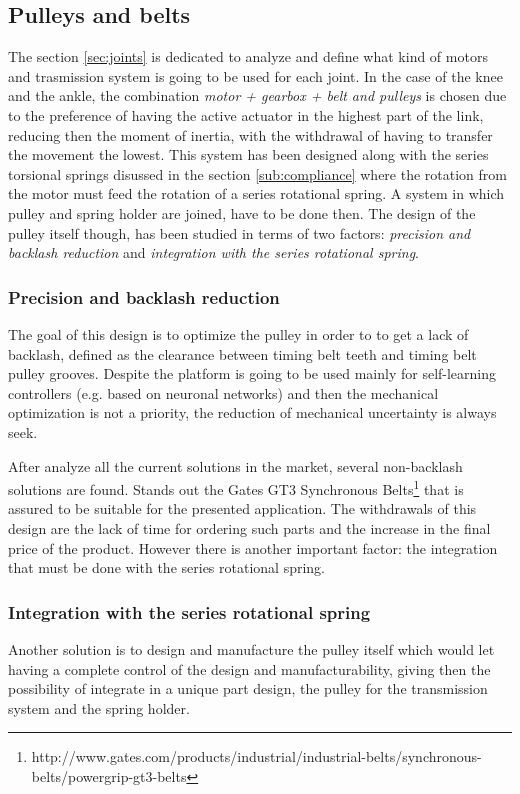 \subsection{Pulleys and belts} %
\label{sub:pulleys_and_belts}
The section \ref{sec:joints} is dedicated to analyze and define what kind of motors and trasmission system is going to be used for each joint.
In the case of the knee and the ankle, the combination \textit{motor + gearbox + belt and pulleys} is chosen due to the preference of having the active actuator in the highest part of the link, reducing then the moment of inertia, with the withdrawal of having to transfer the movement the lowest.
This system has been designed along with the series torsional springs disussed in the section \ref{sub:compliance} where the rotation from the motor must feed the rotation of a series rotational spring.
A system in which pulley and spring holder are joined, have to be done then.
The design of the pulley itself though, has been studied in terms of two factors: \textit{precision and backlash reduction} and \textit{integration with the series rotational spring}.

\subsubsection{Precision and backlash reduction} %
\label{ssub:precision_and_backlash_reduction}
The goal of this design is to optimize the pulley in order to to get a lack of backlash, defined as the clearance between timing belt teeth and timing belt pulley grooves.
Despite the platform is going to be used mainly for self-learning controllers (e.g. based on neuronal networks) and then the mechanical optimization is not a priority, the reduction of mechanical uncertainty is always seek.

After analyze all the current solutions in the market, several non-backlash solutions are found.
Stands out the Gates GT3 Synchronous Belts\footnote{http://www.gates.com/products/industrial/industrial-belts/synchronous-belts/powergrip-gt3-belts} that is assured to be suitable for the presented application.
The withdrawals of this design are the lack of time for ordering such parts and the increase in the final price of the product. 
However there is another important factor: the integration that must be done with the series rotational spring.

\subsubsection{Integration with the series rotational spring} %
\label{ssub:integration_with_the_series_rotational}
Another solution is to design and manufacture the pulley itself which would let having a complete control of the design and manufacturability, giving then the possibility of integrate in a unique part design, the pulley for the transmission system and the spring holder.

